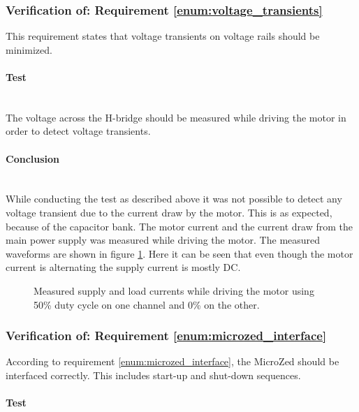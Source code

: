 \subsubsection{Verification of: Requirement \ref{enum:voltage_transients}} %
\label{ssub:requirement_enum:voltage_transients}
This requirement states that voltage transients on voltage rails should be minimized.

\paragraph{Test}~\\
The voltage across the H-bridge should be measured while driving the motor in order to detect voltage transients. 

\paragraph{Conclusion}~\\
While conducting the test as described above it was not possible to detect any voltage transient due to the current draw by the motor.
This is as expected, because of the capacitor bank.
The motor current and the current draw from the main power supply was measured while driving the motor.
The measured waveforms are shown in figure \ref{fig:controllerboardv2_currents}.
Here it can be seen that even though the motor current is alternating the supply current is mostly DC.
\begin{figure}[h]
	\centering
	\caption[Measured supply and load currents.]{Measured supply and load currents while driving the motor using 50\% duty cycle on one channel and 0\% on the other.}
	\label{fig:controllerboardv2_currents}
\end{figure}

\subsubsection{Verification of: Requirement \ref{enum:microzed_interface}} %
\label{ssub:requirement_enum:microzed_interface}
According to requirement  \ref{enum:microzed_interface}, the MicroZed should be interfaced correctly. 
This includes start-up and shut-down sequences.

\paragraph{Test}~\\

